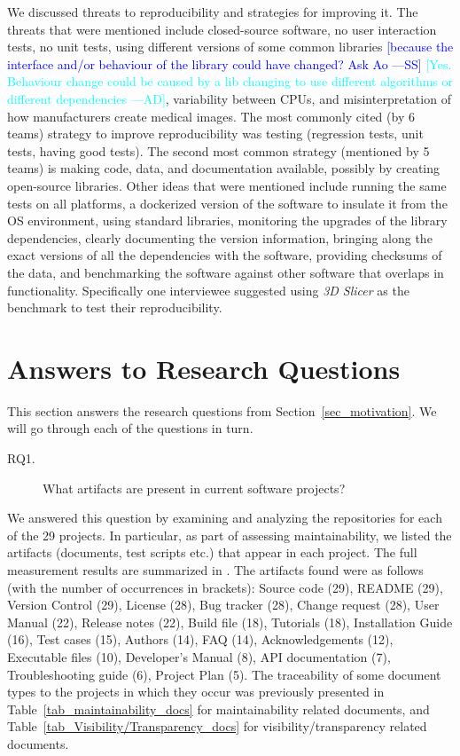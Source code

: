 \documentclass[final, 3p, times, authoryear]{elsarticle}
\newcommand{\authornote}[3]{\textcolor{#1}{[#3 ---#2]}}
\newcommand{\authornote}[3]{}
\newcommand{\wss}[1]{\authornote{blue}{SS}{#1}} %
\newcommand{\ad}[1]{\authornote{cyan}{AD}{#1}} %
\begin{document}
We discussed threats to reproducibility and strategies for improving it.  The
threats that were mentioned include closed-source software, no user interaction
tests, no unit tests, using different versions of some common libraries
\wss{because the interface and/or behaviour of the library could have changed?
Ask Ao} \ad{Yes. Behaviour change could be caused by a lib changing to use
different algorithms or different dependencies}, variability
between CPUs, and misinterpretation of how manufacturers
create medical images. The most commonly cited (by 6 teams) strategy to improve
reproducibility was testing (regression tests, unit tests, having good tests).
The second most common strategy (mentioned by 5 teams) is making code, data, and
documentation available, possibly by creating open-source libraries.  Other
ideas that were mentioned include running the same tests on all platforms, a
dockerized version of the software to insulate it from the OS environment, using
standard libraries, monitoring the upgrades of the library dependencies, clearly
documenting the version information, bringing along the exact versions of all
the dependencies with the software, providing checksums of the data, and
benchmarking the software against other software that overlaps in functionality.
Specifically one interviewee suggested using \textit{3D Slicer} as the benchmark
to test their reproducibility.

\section{Answers to Research Questions} \label{ch_answers}

This section answers the research questions from
Section~\ref{sec_motivation}.  We will go through each of the questions
in turn.

\begin{description}
\item[RQ1.] What artifacts are present in current software projects?
\end{description}

We answered this question by examining and analyzing the repositories for each
of the 29 projects.  In particular, as part of assessing maintainability, we
listed the artifacts (documents, test scripts etc.) that appear in each project.
The full measurement results are summarized in \citet{Dong2021-Data}.  The
artifacts found were as follows (with the number of occurrences in brackets):
Source code (29), README (29), Version Control (29), License (28), Bug tracker
(28), Change request (28), User Manual (22), Release notes (22), Build file
(18), Tutorials (18), Installation Guide (16), Test cases (15), Authors (14),
FAQ (14), Acknowledgements (12), Executable files (10), Developer's Manual (8),
API documentation (7), Troubleshooting guide (6), Project Plan (5).  The
traceability of some document types to the projects in which they occur was
previously presented in Table~\ref{tab_maintainability_docs} for maintainability
related documents, and Table~\ref{tab_Visibility/Transparency_docs} for
visibility/transparency related documents.
\end{document}
